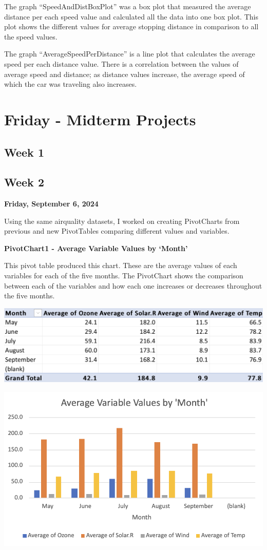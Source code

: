 \documentclass[
  letterpaper,
  DIV=11,
  numbers=noendperiod]{scrreprt}
\begin{document}
The graph ``SpeedAndDistBoxPlot'' was a box plot that measured the
average distance per each speed value and calculated all the data into
one box plot. This plot shows the different values for average stopping
distance in comparison to all the speed values.

The graph ``AverageSpeedPerDistance'' is a line plot that calculates the
average speed per each distance value. There is a correlation between
the values of average speed and distance; as distance values increase,
the average speed of which the car was traveling also increases.

\section{Friday - Midterm Projects}\label{friday---midterm-projects-1}

\subsection{Week 1}\label{week-1-3}

\subsection{Week 2}\label{week-2-3}

\textbf{Friday, September 6, 2024}

Using the same airquality datasets, I worked on creating PivotCharts
from previous and new PivotTables comparing different values and
variables.

\textbf{PivotChart1 - Average Variable Values by `Month'}

This pivot table produced this chart. These are the average values of
each variables for each of the five months. The PivotChart shows the
comparison between each of the variables and how each one increases or
decreases throughout the five months.

\includegraphics{PivotTable1_AverageVariableValues_Pena.png}

\includegraphics{PivotChart1_AverageVariableValues_Pena.png}
\end{document}

